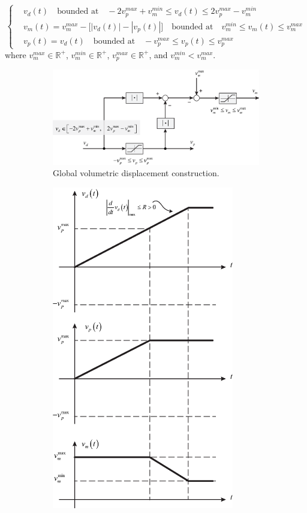 \documentclass[11pt,a4paper,oneside]{book}
\numberwithin{equation}{section}
\newcommand{\abs}[1]{\left|#1\right|}
\theoremstyle{it}
\theoremstyle{definition}
\begin{document}
\begin{equation}
	\left\lbrace 
	\begin{aligned}
		& v_d(t)\quad \text{bounded at} \quad -2v_p^{max}+v_m^{min}\le v_d(t) \le 2v_p^{max}-v_m^{min} \\[6pt]
		& v_m(t) = v_m^{max} - \Big[\abs{v_d(t)} - \abs{v_p(t)}\Big] \quad \text{bounded at} \quad v_m^{min}\le v_m(t) \le v_m^{max} \\[6pt]
		& v_p(t) = v_d(t) \quad \text{bounded at} \quad -v_p^{max}\le v_p(t) \le v_p^{max}
	\end{aligned}\right. 
\end{equation}
where $v_m^{max}\in\mathbb{R}^+$, $v_m^{min}\in\mathbb{R}^+$, $v_p^{max}\in\mathbb{R}^+$, and $v_m^{min}<v_m^{max}$.
\begin{figure}[H]
	\centering
	\begin{subfigure}{.5\textwidth}
	\centering
	\includegraphics[width = 380pt, angle = 90, keepaspectratio]{figures/global_volumetric_displacement_1.eps}
	\captionsetup{width=0.75\textwidth}		
	\caption{Global volumetric displacement construction.}
	\label{global_volumetric_diplacement}
	\end{subfigure}%
	\begin{subfigure}{.5\textwidth}
	\centering
	\includegraphics[width = 225pt, angle = 0, keepaspectratio]{figures/mutual_operability_volumetric_displacements.eps}

\end{subfigure}
\end{figure}
\end{document}
